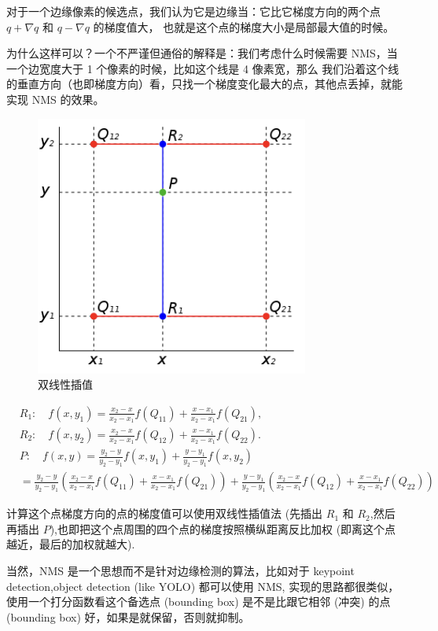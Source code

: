 对于一个边缘像素的候选点，我们认为它是边缘当：它比它梯度方向的两个点 $q+\nabla q$ 和 $q-\nabla q$ 的梯度值大，
也就是这个点的梯度大小是局部最大值的时候。

为什么这样可以？一个不严谨但通俗的解释是：我们考虑什么时候需要 NMS，当一个边宽度大于 1 个像素的时候，比如这个线是 4 像素宽，那么
我们沿着这个线的垂直方向（也即梯度方向）看，只找一个梯度变化最大的点，其他点丢掉，就能实现 NMS 的效果。

\begin{figure}[htbp]
    \centering
	\includegraphics[scale=0.4]{figures/bilinear.png}
	\caption{双线性插值}
\end{figure}

\[
\begin{aligned}
    &R_{1}{:}\quad f(x,y_{1})=\frac{x_{2}-x}{x_{2}-x_{1}}f(Q_{11})+\frac{x-x_{1}}{x_{2}-x_{1}}f(Q_{21}),\\
    &R_{2}{:}\quad f(x,y_{2})=\frac{x_{2}-x}{x_{2}-x_{1}}f(Q_{12})+\frac{x-x_{1}}{x_{2}-x_{1}}f(Q_{22}).\\
    &P{:}\quad f(x,y)=\frac{y_{2}-y}{y_{2}-y_{1}}f(x,y_{1})+\frac{y-y_{1}}{y_{2}-y_{1}}f(x,y_{2})\\&=\frac{y_{2}-y}{y_{2}-y_{1}}\left(\frac{x_{2}-x}{x_{2}-x_{1}}f(Q_{11})+\frac{x-x_{1}}{x_{2}-x_{1}}f(Q_{21})\right)+\frac{y-y_{1}}{y_{2}-y_{1}}\left(\frac{x_{2}-x}{x_{2}-x_{1}}f(Q_{12})+\frac{x-x_{1}}{x_{2}-x_{1}}f(Q_{22})\right)
\end{aligned}
\]

计算这个点梯度方向的点的梯度值可以使用双线性插值法 (先插出 $R_1$ 和 $R_2$,然后再插出 $P$),也即把这个点周围的四个点的梯度按照横纵距离反比加权 (即离这个点越近，最后的加权就越大).

当然，NMS 是一个思想而不是针对边缘检测的算法，比如对于 keypoint detection,object detection (like YOLO) 都可以使用 NMS,
实现的思路都很类似，使用一个打分函数看这个备选点 (bounding box) 是不是比跟它相邻 (冲突) 的点 (bounding box) 好，如果是就保留，否则就抑制。

